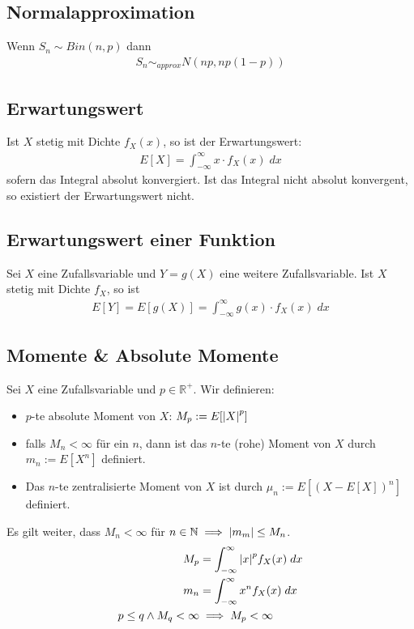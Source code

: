 \documentclass[8pt]{extarticle}
\newcommand{\N}{\mathbb{N}}
\newcommand{\R}{\mathbb{R}}
\begin{document}
\begin{multicols*}{3}
  \subsection*{Normalapproximation}
  Wenn $S_n \sim Bin (n, p)$ dann
  \begin{align*}
    S_n \sim_{approx} N (np, np (1-p))
  \end{align*}
  \subsection*{Erwartungswert}
  Ist $X$ stetig mit Dichte $f_X (x)$, so ist der Erwartungswert:
  \begin{align*}
    E[X] = \int_{-\infty}^\infty x \cdot f_X (x) \; dx
  \end{align*}
  sofern das Integral absolut konvergiert. Ist das Integral nicht
  absolut konvergent, so existiert der Erwartungswert nicht.
  \subsection*{Erwartungswert einer Funktion}
  Sei $X$ eine Zufallsvariable und $Y = g (X)$ eine weitere Zufallsvariable. Ist
  $X$ stetig mit Dichte $f_X$, so ist
  \begin{align*}
    E[Y] = E[g (X)] = \int_{-\infty}^\infty g (x) \cdot f_X (x) \; dx
  \end{align*}
  \subsection*{Momente \& Absolute Momente}
  Sei $X$ eine Zufallsvariable und $p \in \R^+$. Wir definieren:
  \begin{itemize}
    \item $p$-te absolute Moment von $X$: $M_p := E[\abs{X}^p]$
    \item falls $M_n < \infty$ für ein $n$, dann ist das $n$-te  (rohe) Moment von $X$
          durch $m_n := E[X^n]$ definiert.
    \item Das $n$-te zentralisierte Moment von $X$ ist durch $\mu_n := E[ (X - E[X])^n]$
          definiert.
  \end{itemize}
  Es gilt weiter, dass $M_n < \infty$ für $n \in \N \implies \abs{m_m} \leq M_n$.
  \begin{align*}
    M_p                         & = \int_{-\infty}^\infty \abs{x}^p f_X (x) \; dx \\
    m_n                         & = \int_{-\infty}^\infty x^n f_X (x) \; dx       \\
    p \leq q \land M_q < \infty & \implies M_p < \infty
  \end{align*}

\end{multicols*}
\end{document}
